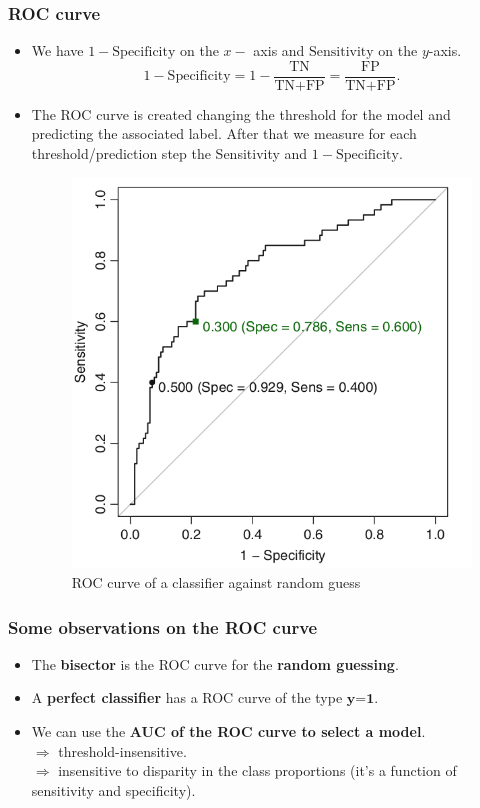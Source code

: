 \documentclass[9pt]{beamer}
\begin{document}
\begin{frame}
\frametitle{ROC curve}
\begin{itemize}
\item<1 -> We have $1-\mbox{Specificity}$ on the $x-$ axis and $\mbox{Sensitivity}$ on the $y$-axis.
$$1-\mbox{Specificity}= 1 - \dfrac{\mbox{TN}}{\mbox{TN+FP}} = \dfrac{\mbox{FP}}{\mbox{TN+FP}}.$$
\item<2 -> The ROC curve is created changing the threshold for the model and predicting the associated label. After that we measure for each threshold/prediction step the Sensitivity and $1-\mbox{Specificity}$.
\vspace{2mm}
\begin{figure}[ht]
\includegraphics[scale=0.25]{images/ROC curve.png}
\caption{ROC curve of a classifier against random guess}
\end{figure}
\end{itemize}

\end{frame}

\begin{frame}
\frametitle{Some observations on the ROC curve}
\begin{itemize}
\item<1 -> The \textbf{bisector} is the ROC curve for the \textbf{random guessing}.
\item<2 -> A \textbf{perfect classifier} has a ROC curve of the type $\textbf{y=1}$. 
\item<3 -> We can use the \textbf{AUC of the ROC curve to select a model}.\\
$\Rightarrow$ threshold-insensitive.\\
$\Rightarrow$ insensitive to disparity in the class proportions (it's a function of sensitivity and specificity).\\
\end{itemize}
\end{frame}
\end{document}

